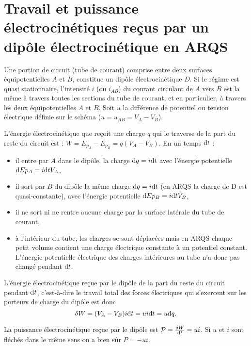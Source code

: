 \section{Travail et puissance électrocinétiques reçus par un dipôle 
électrocinétique en ARQS}%
\label{chap9-sec:travailetpuissance}%

Une portion de circuit (tube de courant) comprise entre deux surfaces 
équipotentielles \(A\) et \(B\), constitue un dipôle électrocinétique \(D\). Si 
le régime est quasi stationnaire, l'intensité \(i\) (ou \(i_{AB}\))  du courant 
circulant de \(A\) vers \(B\) est la même à travers toutes les sections du tube 
de courant, et en particulier, à travers les deux équipotentielles \(A\) et 
\(B\). Soit \(u\) la différence de potentiel ou tension électrique définie sur 
le schéma (\(u = u_{AB} = V_A - V_B\)).

L'énergie électrocinétique que reçoit une charge \(q\) qui le traverse de la 
part du reste du circuit est : \(W = E_{p_A} - E_{p_B} = q(V_A - V_B)\). En un 
temps \(\mathrm{d} t\) :
\begin{itemize}%
\item il entre par \(A\) dans le dipôle, la charge \(\mathrm{d} q = i \mathrm{d} t\) avec 
  l'énergie potentielle \(\mathrm{d} Ep_A = i \mathrm{d} t V_A\),
\item il sort par \(B\) du dipôle la même charge \(\mathrm{d} q = i \mathrm{d} t\) (en ARQS la 
  charge de D est quasi-constante), avec l'énergie potentielle \(\mathrm{d} Ep_B = i \mathrm{d} 
    t V_B\),
\item il ne sort ni ne rentre aucune charge par la surface latérale du tube de 
  courant,
\item à l'intérieur du tube, les charges se sont déplacées mais en ARQS chaque 
  petit volume contient une charge électrique constante à un potentiel 
    constant. L'énergie potentielle électrique des charges intérieures au tube 
    n'a donc pas changé pendant \(\mathrm{d} t\).
\end{itemize}%
L'énergie électrocinétique reçue par le dipôle de la part du reste du circuit 
pendant \(\mathrm{d} t\), c'est-à-dire le travail total des forces électriques qui 
s'exercent sur les porteurs de charge du dipôle est donc
\begin{equation}%
\delta W = (V_A - V_B) i \D t = u i \D t = u \D q.
\end{equation}%

La puissance électrocinétique reçue par le dipôle est \(\mathcal{P} = \frac{\delta W}{\mathrm{d} 
t}=ui\). Si \(u\) et \(i\) sont fléchés dans le même sens on a bien sûr \(P = 
-ui\).

